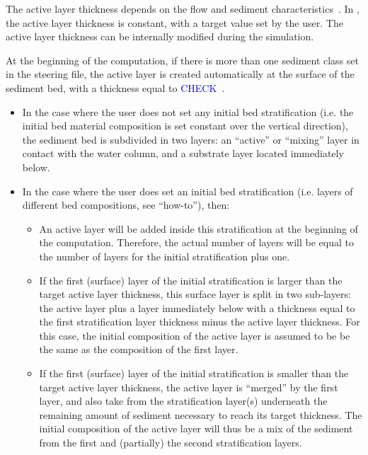 The active layer thickness depends on the flow and sediment characteristics~\cite{ref41}. In \gaia{}, the active layer thickness is constant, with a target value set by the user. The active layer thickness can be internally modified during the simulation. 

At the beginning of the computation, if there is more than one sediment class set in the steering file, the active layer is created automatically at the surface of the sediment bed, with a thickness equal to \textcolor{blue}{CHECK}~\cite{}. 

\begin{itemize}
\item In the case where the user does not set any initial bed stratification (i.e. the initial bed material composition is set constant over the vertical direction), the sediment bed is subdivided in two layers: an ``active'' or ``mixing'' layer in contact with the water column, and a substrate layer located immediately below.
\item In the case where the user does set an initial bed stratification (i.e. layers of different bed compositions, see ``how-to''), then:
  \begin{itemize}
  \item An active layer will be added inside this stratification at the beginning of the computation. Therefore, the actual number of layers will be equal to the number of layers for the initial stratification plus one.
  \item If the first (surface) layer of the initial stratification is larger than the target active layer thickness, this surface layer is split in two sub-layers: the active layer plus a layer immediately below with a thickness equal to the first stratification layer thickness minus the active layer thickness. For this case, the initial composition of the active layer is assumed to be be the same as the composition of the first layer.
  \item If the first (surface) layer of the initial stratification is smaller than the target active layer thickness, the active layer is ``merged'' by the first layer, and also take from the stratification layer(s) underneath the remaining amount of sediment necessary to reach its target thickness. The initial composition of the active layer will thus be a mix of the sediment from the first and (partially) the second stratification layers. 
  \end{itemize}
\end{itemize}


